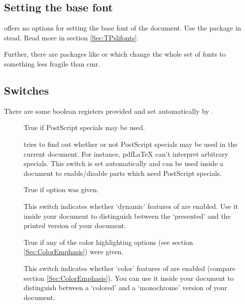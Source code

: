 \documentclass[12pt]{scrartcl}
\let\newslide=\relax
\begin{document}
\newslide

\subsection{Setting the base font}\label{Sec:BaseFont}
 offers no options for setting the base font of the document.
Use the  package in stead. Read more in section \ref{Sec:TPslifonts}.

Further, there are packages like  or  which change the whole set of fonts to something less
fragile than cmr.

\newslide

\subsection{Switches}
There are some boolean registers provided and set automatically by .

\begin{description}
\item[] True if PostScript\textsuperscript{\textregistered} specials may be
  used.

   tries to find out whether or not PostScript\textsuperscript{\textregistered} specials may be used in
  the current document. For instance, pdf\LaTeX{} can't interpret arbitrary specials. This switch is set automatically
  and can be used inside a document to enable/disable parts which need PostScript\textsuperscript{\textregistered}
  specials.

\newslide

\item[] True if  option was given.

  This switch indicates whether `dynamic' features of  are enabled. Use it inside your document
  to distinguish between the `presented' and the printed version of your document.

\item[] True if any of the color highlighting options (see section
  \ref{Sec:ColorEmphasis}) were given.

  This switch indicates whether `color' features of  are enabled (compare section
  \ref{Sec:ColorEmphasis}). You can use it inside your document to distinguish between a `colored' and a `monochrome'
  version of your document.
\end{description}
\end{document}

